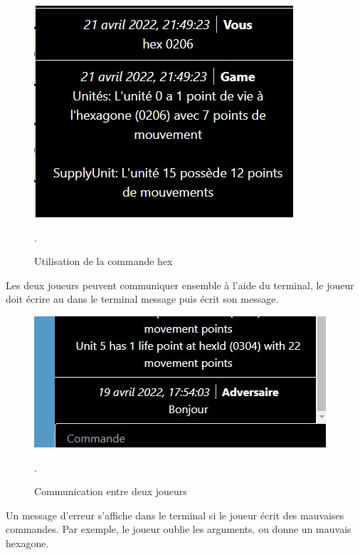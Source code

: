 \begin{figure}[H]
    \centering
    \includegraphics[scale=0.6]{data/hex_command.jpg}
    \caption{Utilisation de la commande hex}.
\end{figure}

Les deux joueurs peuvent communiquer ensemble  à l'aide du terminal, le joueur doit écrire au dans le terminal \og message \fg{} puis écrit son message.\\
\begin{figure}[H]
\centering
\includegraphics[scale=0.6]{data/chat.jpg}
\caption{Communication entre deux joueurs}.
\end{figure}

Un message d'erreur s'affiche dans le terminal si le joueur écrit  des mauvaises commandes.
Par exemple, le joueur oublie les arguments, ou donne un mauvais hexagone.\\

